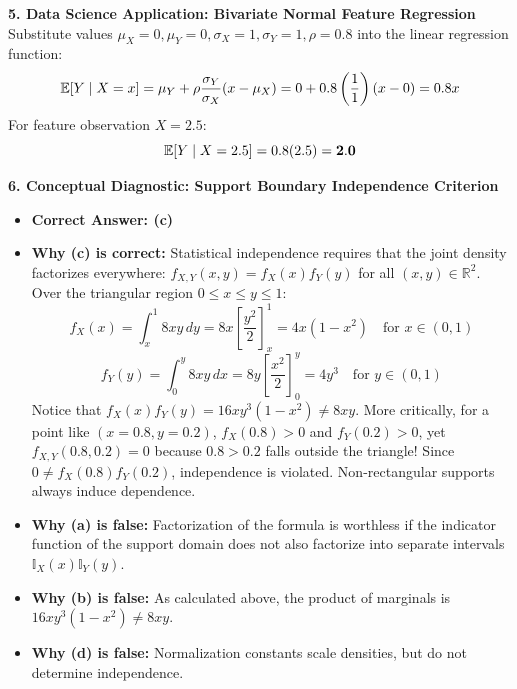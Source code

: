 \textbf{5. Data Science Application: Bivariate Normal Feature Regression}
Substitute values $\mu_X = 0, \mu_Y = 0, \sigma_X = 1, \sigma_Y = 1, \rho = 0.8$ into the linear regression function:
$$\mathbb{E}[Y \mid X = x] = \mu_Y + \rho \frac{\sigma_Y}{\sigma_X} (x - \mu_X) = 0 + 0.8 \left(\frac{1}{1}\right) (x - 0) = 0.8 x$$
For feature observation $X = 2.5$:
$$\mathbb{E}[Y \mid X = 2.5] = 0.8(2.5) = \mathbf{2.0}$$

\textbf{6. Conceptual Diagnostic: Support Boundary Independence Criterion}
\begin{itemize}
    \item \textbf{Correct Answer: (c)}
    \item \textbf{Why (c) is correct:} Statistical independence requires that the joint density factorizes everywhere: $f_{X,Y}(x, y) = f_X(x) f_Y(y)$ for all $(x, y) \in \mathbb{R}^2$. 
    Over the triangular region $0 \le x \le y \le 1$:
    $$f_X(x) = \int_x^1 8xy \, dy = 8x \left[ \frac{y^2}{2} \right]_x^1 = 4x(1 - x^2) \quad \text{for } x \in (0, 1)$$
    $$f_Y(y) = \int_0^y 8xy \, dx = 8y \left[ \frac{x^2}{2} \right]_0^y = 4y^3 \quad \text{for } y \in (0, 1)$$
    Notice that $f_X(x) f_Y(y) = 16x y^3(1 - x^2) \neq 8xy$.
    More critically, for a point like $(x=0.8, y=0.2)$, $f_X(0.8) > 0$ and $f_Y(0.2) > 0$, yet $f_{X,Y}(0.8, 0.2) = 0$ because $0.8 > 0.2$ falls outside the triangle! Since $0 \neq f_X(0.8)f_Y(0.2)$, independence is violated. Non-rectangular supports always induce dependence.
    \item \textbf{Why (a) is false:} Factorization of the formula is worthless if the indicator function of the support domain does not also factorize into separate intervals $\mathbb{I}_X(x) \mathbb{I}_Y(y)$.
    \item \textbf{Why (b) is false:} As calculated above, the product of marginals is $16x y^3 (1 - x^2) \neq 8xy$.
    \item \textbf{Why (d) is false:} Normalization constants scale densities, but do not determine independence.
\end{itemize}

